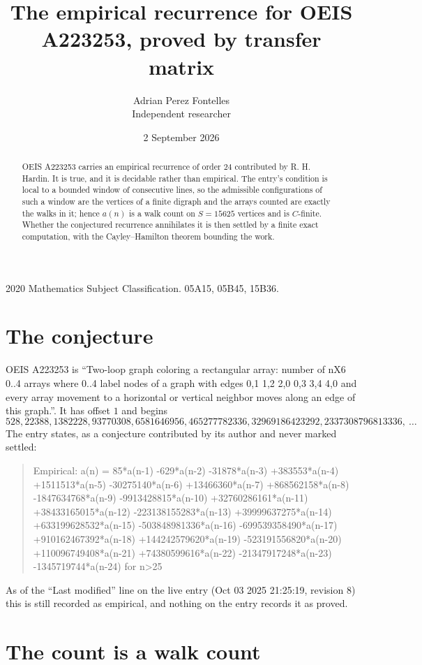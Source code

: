 \documentclass[11pt,a4paper]{article}
\title{The empirical recurrence for OEIS A223253, proved by transfer matrix}
\author{Adrian Perez Fontelles\\ \small Independent researcher}
\date{2 September 2026}
\theoremstyle{plain}
\theoremstyle{definition}
\begin{document}
\maketitle

\begin{abstract}
OEIS A223253 carries an empirical recurrence of order $24$ contributed by R. H. Hardin. It is
true, and it is decidable rather than empirical. The entry's condition is local to a bounded window of consecutive lines, so
the admissible configurations of such a window are the vertices of a finite digraph and the
arrays counted are exactly the walks in it; hence $a(n)$ is a walk count on $S=15625$ vertices
and is $C$-finite. Whether the conjectured recurrence annihilates it is then settled by a
finite exact computation, with the Cayley--Hamilton theorem bounding the work.
\end{abstract}

\noindent\small 2020 Mathematics Subject Classification. 05A15, 05B45, 15B36.\normalsize

\section{The conjecture}

OEIS A223253 is ``Two-loop graph coloring a rectangular array: number of nX6 0..4 arrays where 0..4 label nodes of a graph with edges 0,1 1,2 2,0 0,3 3,4 4,0 and every array movement to a horizontal or vertical neighbor moves along an edge of this graph.''. It has offset $1$ and begins
\[
528, 22388, 1382228, 93770308, 6581646956, 465277782336, 32969186423292, 2337308796813336,\ \dots
\]
The entry states, as a conjecture contributed by its author and never marked settled:
\begin{quote}\raggedright\small
Empirical: a(n) = 85*a(n-1) -629*a(n-2) -31878*a(n-3) +383553*a(n-4) +1511513*a(n-5) -30275140*a(n-6) +13466360*a(n-7) +868562158*a(n-8) -1847634768*a(n-9) -9913428815*a(n-10) +32760286161*a(n-11) +38433165015*a(n-12) -223138155283*a(n-13) +39999637275*a(n-14) +633199628532*a(n-15) -503848981336*a(n-16) -699539358490*a(n-17) +910162467392*a(n-18) +144242579620*a(n-19) -523191556820*a(n-20) +110096749408*a(n-21) +74380599616*a(n-22) -21347917248*a(n-23) -1345719744*a(n-24) for n>25
\end{quote}
As of the ``Last modified'' line on the live entry (Oct 03 2025 21:25:19, revision 8) this is still
recorded as empirical, and nothing on the entry records it as proved.

\section{The count is a walk count}
\end{document}
